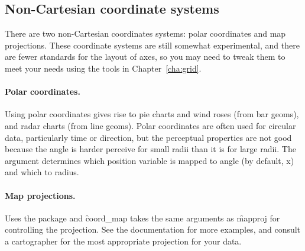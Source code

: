 \subsection{Non-Cartesian coordinate systems}

There are two non-Cartesian coordinates systems: polar coordinates and map projections.  These coordinate systems are still somewhat experimental, and there are fewer standards for the layout of axes, so you may need to tweak them to meet your needs using the tools in Chapter~\ref{cha:grid}.

\paragraph{Polar coordinates.}  Using polar coordinates gives rise to pie charts and wind roses (from bar geoms), and radar charts (from line geoms).  Polar coordinates are often used for circular data, particularly time or direction, but the perceptual properties are not good because the angle is harder perceive for small radii than it is for large radii.  The  argument determines which position variable is mapped to angle (by default, x) and which to radius.  

\paragraph{Map projections.}  Uses the  package \citep{mapproj} and \f{coord_map} takes the same arguments as \f{mapproj} for controlling the projection.  See the documentation for more examples, and consult a cartographer for the most appropriate projection for your data.

